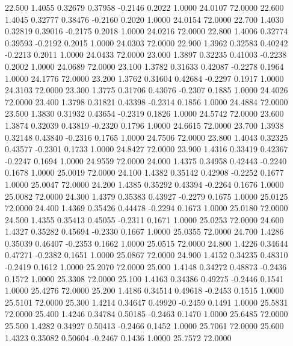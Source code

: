   22.500   1.4055   0.32679   0.37958  -0.2146   0.2022   1.0000  24.0107  72.0000
  22.600   1.4045   0.32777   0.38476  -0.2160   0.2020   1.0000  24.0154  72.0000
  22.700   1.4030   0.32819   0.39016  -0.2175   0.2018   1.0000  24.0216  72.0000
  22.800   1.4006   0.32774   0.39593  -0.2192   0.2015   1.0000  24.0303  72.0000
  22.900   1.3962   0.32583   0.40242  -0.2213   0.2011   1.0000  24.0433  72.0000
  23.000   1.3897   0.32235   0.41003  -0.2238   0.2002   1.0000  24.0689  72.0000
  23.100   1.3782   0.31633   0.42087  -0.2278   0.1964   1.0000  24.1776  72.0000
  23.200   1.3762   0.31604   0.42684  -0.2297   0.1917   1.0000  24.3103  72.0000
  23.300   1.3775   0.31706   0.43076  -0.2307   0.1885   1.0000  24.4026  72.0000
  23.400   1.3798   0.31821   0.43398  -0.2314   0.1856   1.0000  24.4884  72.0000
  23.500   1.3830   0.31932   0.43654  -0.2319   0.1826   1.0000  24.5742  72.0000
  23.600   1.3874   0.32039   0.43819  -0.2320   0.1796   1.0000  24.6615  72.0000
  23.700   1.3938   0.32148   0.43840  -0.2316   0.1765   1.0000  24.7506  72.0000
  23.800   1.4043   0.32325   0.43577  -0.2301   0.1733   1.0000  24.8427  72.0000
  23.900   1.4316   0.33419   0.42367  -0.2247   0.1694   1.0000  24.9559  72.0000
  24.000   1.4375   0.34958   0.42443  -0.2240   0.1678   1.0000  25.0019  72.0000
  24.100   1.4382   0.35142   0.42908  -0.2252   0.1677   1.0000  25.0047  72.0000
  24.200   1.4385   0.35292   0.43394  -0.2264   0.1676   1.0000  25.0082  72.0000
  24.300   1.4379   0.35383   0.43927  -0.2279   0.1675   1.0000  25.0125  72.0000
  24.400   1.4369   0.35426   0.44478  -0.2294   0.1673   1.0000  25.0180  72.0000
  24.500   1.4355   0.35413   0.45055  -0.2311   0.1671   1.0000  25.0253  72.0000
  24.600   1.4327   0.35282   0.45694  -0.2330   0.1667   1.0000  25.0355  72.0000
  24.700   1.4286   0.35039   0.46407  -0.2353   0.1662   1.0000  25.0515  72.0000
  24.800   1.4226   0.34644   0.47271  -0.2382   0.1651   1.0000  25.0867  72.0000
  24.900   1.4152   0.34235   0.48310  -0.2419   0.1612   1.0000  25.2070  72.0000
  25.000   1.4148   0.34272   0.48873  -0.2436   0.1572   1.0000  25.3308  72.0000
  25.100   1.4163   0.34386   0.49275  -0.2446   0.1541   1.0000  25.4276  72.0000
  25.200   1.4186   0.34514   0.49618  -0.2453   0.1515   1.0000  25.5101  72.0000
  25.300   1.4214   0.34647   0.49920  -0.2459   0.1491   1.0000  25.5831  72.0000
  25.400   1.4246   0.34784   0.50185  -0.2463   0.1470   1.0000  25.6485  72.0000
  25.500   1.4282   0.34927   0.50413  -0.2466   0.1452   1.0000  25.7061  72.0000
  25.600   1.4323   0.35082   0.50604  -0.2467   0.1436   1.0000  25.7572  72.0000
